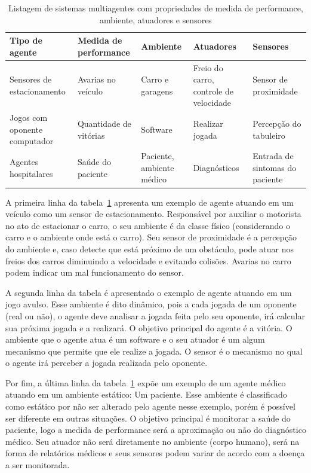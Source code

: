 \begin{table}
	\caption{Listagem de sistemas multiagentes com propriedades de medida de performance, ambiente, atuadores e sensores}
	\begin{tabular}{|p{3cm} | p{3cm} | p{2cm}| p{3cm} | p{3cm} |}
		\hline
		\textbf{Tipo de agente}	& \textbf{Medida de performance} & \textbf{Ambiente} & \textbf{Atuadores}  & \textbf{Sensores}	\\
		\hline
		Sensores de estacionamento	& Avarias no veículo & Carro e garagens & Freio do carro, controle de velocidade & Sensor de proximidade	\\
		\hline
		Jogos com oponente computador	& Quantidade de vitórias &	Software & Realizar jogada & Percepção do tabuleiro	\\
		\hline
		Agentes hospitalares		& Saúde do paciente & Paciente, ambiente médico & Diagnósticos & Entrada de sintomas do paciente	\\
		\hline
	\end{tabular}
	\label{lista_agentes}
\end{table}
 
A primeira linha da tabela~\ref{lista_agentes} apresenta um exemplo de agente atuando em um veículo como um sensor de estacionamento. Responsável por auxiliar o motorista no ato de estacionar o carro, o seu ambiente é da classe físico (considerando o carro e o ambiente onde está o carro). Seu sensor de proximidade é a percepção do ambiente e, caso detecte que está próximo de um obstáculo, pode atuar nos freios dos carros diminuindo a velocidade e evitando colisões. Avarias no carro podem indicar um mal funcionamento do sensor.

A segunda linha da tabela é apresentado o exemplo de agente atuando em um jogo avulso. Esse ambiente é dito dinâmico, pois a cada jogada de um oponente (real ou não), o agente deve analisar a jogada feita pelo seu oponente, irá calcular sua próxima jogada e a realizará. O objetivo principal do agente é a vitória. O ambiente que o agente atua é um software e o seu atuador é um algum mecanismo que permite que ele realize a jogada. O sensor é o mecanismo no qual o agente irá perceber a jogada realizada pelo oponente.

Por fim, a última linha da tabela~\ref{lista_agentes} expõe um exemplo de um agente médico atuando em um ambiente estático: Um paciente. Esse ambiente é classificado como estático por não ser alterado pelo agente nesse exemplo, porém é possível ser diferente em outras situações. O objetivo principal é monitorar a saúde do paciente, logo a medida de performance será a aproximação ou não do diagnóstico médico. Seu atuador não será diretamente no ambiente (corpo humano), será na forma de relatórios médicos e seus sensores podem variar de acordo com a doença a ser monitorada.

